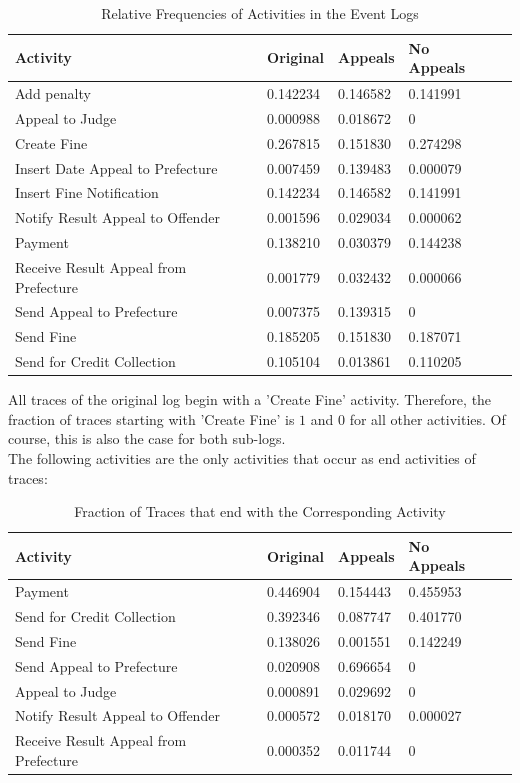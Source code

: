 \documentclass[12pt]{report}
\begin{document}
\begin{table}[H]
\centering
\begin{tabular}{|l|l|l|l|l|}
\hline \textbf{Activity} & \textbf{Original} & \textbf{Appeals} & \textbf{No Appeals} \\
\hline Add penalty & 0.142234 & 0.146582 & 0.141991\\
\hline Appeal to Judge & 0.000988 & 0.018672 &0\\
\hline Create Fine & 0.267815 & 0.151830 & 0.274298\\
\hline Insert Date Appeal to Prefecture & 0.007459 & 0.139483 & 0.000079\\
\hline Insert Fine Notification & 0.142234 & 0.146582 & 0.141991\\
\hline Notify Result Appeal to Offender & 0.001596 & 0.029034 & 0.000062\\
\hline Payment  & 0.138210 & 0.030379 & 0.144238\\
\hline Receive Result Appeal from Prefecture & 0.001779 & 0.032432 & 0.000066\\
\hline Send Appeal to Prefecture  & 0.007375 & 0.139315 & 0\\
\hline Send Fine  & 0.185205 & 0.151830 & 0.187071\\
\hline Send for Credit Collection & 0.105104 & 0.013861 & 0.110205\\
\hline
\end{tabular}
\caption{Relative Frequencies of Activities in the Event Logs}
\label{tab:1c_relative}
\end{table}

All traces of the original log begin with a 'Create Fine' activity. Therefore, the fraction of traces starting with 'Create Fine' is $1$ and $0$ for all other activities. Of course, this is also the case for both sub-logs. \\
The following activities are the only activities that occur as end activities of traces:

\begin{table}[H]
\centering
\begin{tabular}{|l|l|l|l|l|}
\hline \textbf{Activity} & \textbf{Original} & \textbf{Appeals} & \textbf{No Appeals} \\
\hline Payment  & 0.446904 & 0.154443 & 0.455953\\
\hline Send for Credit Collection & 0.392346 & 0.087747 & 0.401770\\
\hline Send Fine  & 0.138026 & 0.001551 & 0.142249\\
\hline Send Appeal to Prefecture  & 0.020908 & 0.696654 & 0\\
\hline Appeal to Judge & 0.000891 & 0.029692 &0\\
\hline Notify Result Appeal to Offender & 0.000572 & 0.018170 & 0.000027\\
\hline Receive Result Appeal from Prefecture & 0.000352 & 0.011744 & 0\\
\hline
\end{tabular}
\caption{Fraction of Traces that end with the Corresponding Activity}
\label{tab:1c_end}
\end{table}
\end{document}
